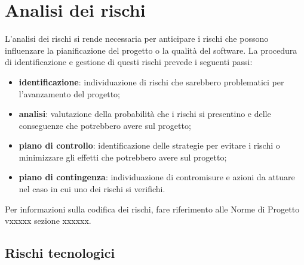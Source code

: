 \section{Analisi dei rischi} \label{sec:analisi-rischi}
L'analisi dei rischi si rende necessaria per anticipare i rischi che possono influenzare la pianificazione del progetto o la qualità del software. 
La procedura di identificazione e gestione di questi rischi prevede i seguenti passi:
\begin{itemize}
    \item \textbf{identificazione}: individuazione di rischi che sarebbero problematici per l'avanzamento del progetto;
    \item \textbf{analisi}: valutazione della probabilità che i rischi si presentino e delle conseguenze che potrebbero avere sul progetto;
    \item \textbf{\textbf{piano di controllo}}: identificazione delle strategie per evitare i rischi o minimizzare gli effetti che potrebbero avere sul progetto;
    \item \textbf{\textbf{piano di contingenza}}: individuazione di contromisure e azioni da attuare nel caso in cui uno dei rischi si verifichi.
\end{itemize}
Per informazioni sulla codifica dei rischi, fare riferimento alle Norme di Progetto vxxxxx sezione xxxxxx. %


\subsection{Rischi tecnologici} %
        
